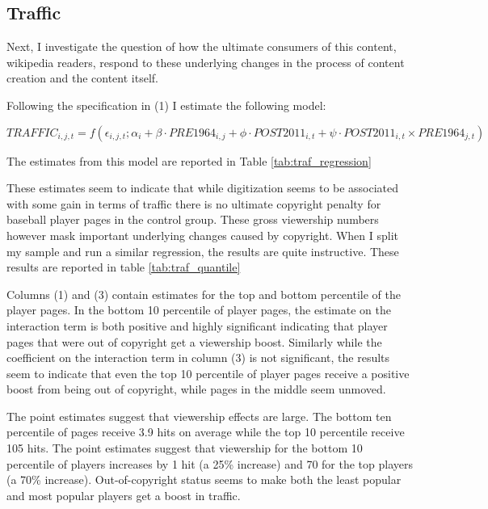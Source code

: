 \documentclass[12pt]{article}
\begin{document}


\subsection{Traffic}

Next, I investigate the question of how the ultimate consumers of this content, wikipedia readers, respond to these underlying changes in the process of content creation and the content itself.

Following the specification in (1) I estimate the following model:

\begin{equation*}
TRAFFIC_{i,j,t} = f(\epsilon_{i,j,t}; \alpha_i + \beta \cdot PRE1964_{i,j}+ \phi \cdot POST2011_{i,t} + \psi \cdot POST2011_{i,t} \times PRE1964_{j,t})
\end{equation*}

The estimates from this model are reported in Table \ref{tab:traf_regression}

\label{tab:traf_regression}


These estimates seem to indicate that while digitization seems to be associated with some gain in terms of traffic there is no ultimate copyright penalty for baseball player pages in the control group. These gross viewership numbers however mask important underlying changes caused by copyright. When I split my sample and run a similar regression, the results are quite instructive. These results are reported in table \ref{tab:traf_quantile}

\label{tab:traf_quantile}


Columns (1) and (3) contain estimates for the top and bottom percentile of the player pages. In the bottom 10 percentile of player pages, the estimate on the interaction term is both positive and highly significant indicating that player pages that were out of copyright get a viewership boost. Similarly while the coefficient on the interaction term in column (3) is not significant, the results seem to indicate that even the top 10 percentile of player pages receive a positive boost from being out of copyright, while pages in the middle seem unmoved. 

The point estimates suggest that viewership effects are large. The bottom ten percentile of pages receive 3.9 hits on average while the top 10 percentile receive 105 hits. The point estimates suggest that viewership for the bottom 10 percentile of players increases by 1 hit (a 25\% increase) and 70 for the top players (a 70\% increase). Out-of-copyright status seems to make both the least popular and most popular players get a boost in traffic. 
\end{document}
